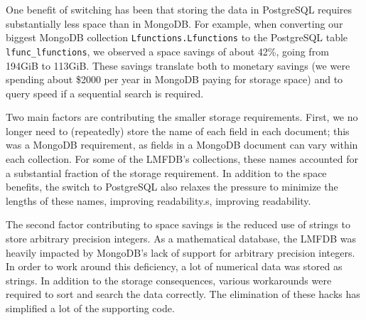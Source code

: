 \documentclass{article}
\begin{document}
One benefit of switching has been that storing the data in PostgreSQL requires substantially less space than in MongoDB.
For example, when converting our biggest MongoDB collection \texttt{Lfunctions.Lfunctions} to the PostgreSQL table \texttt{lfunc\_lfunctions}, we observed a space savings of about 42\%, going from 194GiB to 113GiB.
These savings translate both to monetary savings (we were spending about \$2000 per year in MongoDB paying for storage space) and to query speed if a sequential search is required.



Two main factors are contributing the smaller storage requirements.
First, we no longer need to (repeatedly) store the name of each field in each document; this was a MongoDB requirement, as fields in a MongoDB document can vary within each collection.
For some of the LMFDB's collections, these names accounted for a substantial fraction of the storage requirement.
In addition to the space benefits, the switch to PostgreSQL also relaxes the pressure to minimize the lengths of these names, improving readability.s, improving readability.

The second factor contributing to space savings is the reduced use of strings to store arbitrary precision integers.
As a mathematical database, the LMFDB was heavily impacted by MongoDB's lack of support for arbitrary precision integers.
In order to work around this deficiency, a lot of numerical data was stored as strings.
In addition to the storage consequences, various workarounds were required to sort and search the data correctly.
The elimination of these hacks has simplified a lot of the supporting code.
\end{document}

